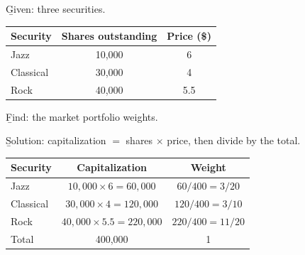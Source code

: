 \begin{example}
    \b{Given}: three securities.
    \begin{center}
    \begin{tabular}{lcc}
        \toprule
        Security & Shares outstanding & Price (\$)\\
        \midrule
        Jazz & 10,000 & 6\\
        Classical & 30,000 & 4\\
        Rock & 40,000 & 5.5\\
        \bottomrule
    \end{tabular}
    \end{center}
    \b{Find}: the market portfolio weights.

    \b{Solution}: capitalization $=$ shares $\times$ price, then divide by the total.
    \begin{center}
    \begin{tabular}{lcc}
        \toprule
        Security & Capitalization & Weight\\
        \midrule
        Jazz & $10{,}000 \times 6 = 60{,}000$ & $60/400 = 3/20$\\
        Classical & $30{,}000 \times 4 = 120{,}000$ & $120/400 = 3/10$\\
        Rock & $40{,}000 \times 5.5 = 220{,}000$ & $220/400 = 11/20$\\
        \midrule
        Total & 400,000 & 1\\
        \bottomrule
    \end{tabular}
    \end{center}
    \begin{center}
    \end{center}
\end{example}


